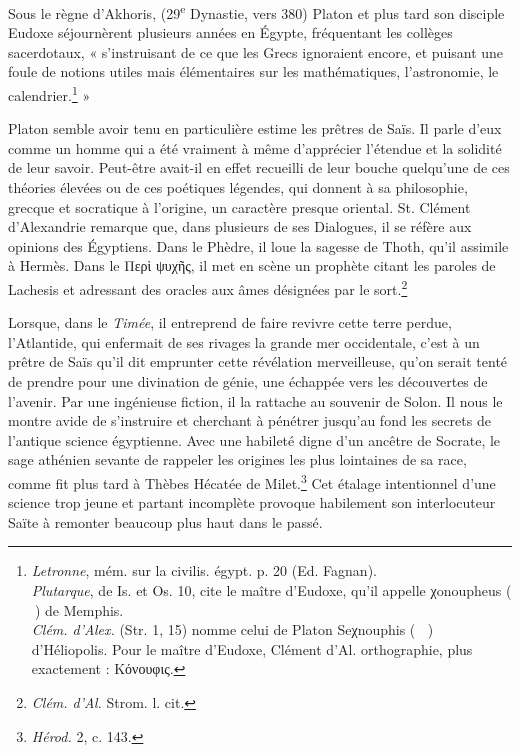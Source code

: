 \documentclass[letterpaper,twocolumn,openany,nodeprecatedcode]{dndbook}
\newcommand*\hieroAABR{}
\newcommand*\hieroAACH{}
\newcommand*\hieroAADB{}
\newcommand*\hieroAAEB{}
\newcommand*\hieroAAFB{}
\newcommand*\hieroAALE{}
\newcommand*\hieroAALF{}
\begin{document}
Sous le règne d'Akhoris, (29\textsuperscript{e} Dynastie, vers 380) Platon et plus tard son disciple Eudoxe séjournèrent plusieurs années en Égypte, fréquentant les collèges sacerdotaux, « s'instruisant de ce que les Grecs ignoraient encore, et puisant une foule de notions utiles mais élémentaires sur les mathématiques, l'astronomie, le calendrier.\footnote{\emph{Letronne}, mém. sur la civilis. égypt. p. 20 (Ed. Fagnan).\\\hspace*{5mm}\emph{Plutarque}, de Is. et Os. 10, cite le maître d'Eudoxe, qu'il appelle χonoupheus ($\hieroAALE\:\hieroAAFB$) de Memphis.\\\hspace*{5mm}\emph{Clém. d'Alex.} (Str. 1, 15) nomme celui de Platon Seχnouphis ($\hieroAALF\:\hieroAACH\:\hieroAABR\allowbreak\:\hieroAADB\:\hieroAAEB$) d'Héliopolis. Pour le maître d'Eudoxe, Clément d'Al. orthographie, plus exactement : Κόνουφις.} »

Platon semble avoir tenu en particulière estime les prêtres de Saïs. Il parle d'eux comme un homme qui a été vraiment à même d'apprécier l'étendue et la solidité de leur savoir. Peut-être avait-il en effet recueilli de leur bouche quelqu'une de ces théories élevées ou de ces poétiques légendes, qui donnent à sa philosophie, grecque et socratique à l'origine, un caractère presque oriental. St. Clément d'Alexandrie remarque que, dans plusieurs de ses Dialogues, il se réfère aux opinions des Égyptiens. Dans le Phèdre, il loue la sagesse de Thoth, qu'il assimile à Hermès. Dans le Περὶ ψυχῆς, il met en scène un prophète citant les paroles de Lachesis et adressant des oracles aux âmes désignées par le sort.\footnote{\emph{Clém. d'Al.} Strom. l. cit.}

Lorsque, dans le \emph{Timée}, il entreprend de faire revivre cette terre perdue, l'Atlantide, qui enfermait de ses rivages la grande mer occidentale, c'est à un prêtre de Saïs qu'il dit emprunter cette révélation merveilleuse, qu'on serait tenté de prendre pour une divination de génie, une échappée vers les découvertes de l'avenir. Par une ingénieuse fiction, il la rattache au souvenir de Solon. Il nous le montre avide de s'instruire et cherchant à pénétrer jusqu'au fond les secrets de l'antique science égyptienne. Avec une habileté digne d'un ancêtre de Socrate, le sage athénien sevante de rappeler les origines les plus lointaines de sa race, comme fit plus tard à Thèbes Hécatée de Milet.\footnote{\emph{Hérod.} 2, c. 143.} Cet étalage intentionnel d'une science trop jeune et partant incomplète provoque habilement son interlocuteur Saïte à remonter beaucoup plus haut dans le passé.
\end{document}
